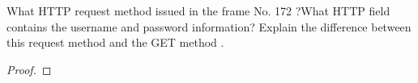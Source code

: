 \documentclass[../../main.tex]{subfiles}
\begin{document}
\begin{wts}
What HTTP request method issued in the frame No. 172 ?What HTTP field contains the username and password information? Explain the difference between this request method and the GET method .
\end{wts}
\begin{proof}

\end{proof}
\end{document}
